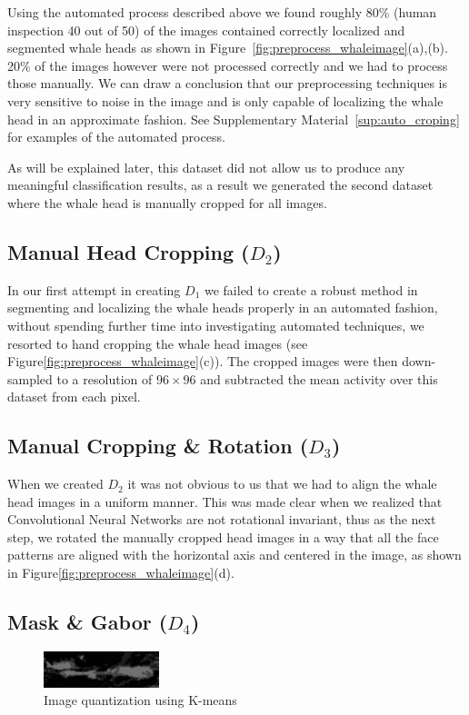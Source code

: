 Using the automated process described above we found roughly 80\% (human inspection 40 out of 50) of the images contained correctly localized and segmented whale heads as shown in Figure~\ref{fig:preprocess_whaleimage}(a),(b). 20\% of the images however were not processed correctly and we had to process those manually. We can draw a conclusion that our preprocessing techniques is very sensitive to noise in the image and is only capable of localizing the whale head in an approximate fashion. See Supplementary Material~\ref{sup:auto_croping} for examples of the automated process.

As will be explained later, this dataset did not allow us to produce any meaningful classification results, as a result we generated the second dataset where the whale head is manually cropped for all images.

\subsection{Manual Head Cropping ($D_{2}$)}
\label{subsec:manual_head_cropping}
In our first attempt in creating $D_{1}$ we failed to create a robust method in segmenting and localizing the whale heads properly in an automated fashion, without spending further time into investigating automated techniques, we resorted to hand cropping the whale head images (see Figure\ref{fig:preprocess_whaleimage}(c)). The cropped images were then down-sampled to a resolution of $96 \times 96$ and subtracted the mean activity over this dataset from each pixel.


\subsection{Manual Cropping \& Rotation ($D_{3}$)}
\label{subsec:manual_cropping_and_rotation}
When we created $D_{2}$ it was not obvious to us that we had to align the whale head images in a uniform manner. This was made clear when we realized that Convolutional Neural Networks are not rotational invariant, thus as the next step, we rotated the manually cropped head images in a way that all the face patterns are aligned with the horizontal axis and centered in the image, as shown in Figure\ref{fig:preprocess_whaleimage}(d).


\newpage
\subsection{Mask \& Gabor ($D_{4}$)}
\begin{figure}
	\centering
	\includegraphics[width=0.3\textwidth]{sections/imgs/preprocessing/kmeans.jpg}
	\caption{Image quantization using K-means}
	\label{fig:kmeans}
\end{figure}
\label{subsec:mask_and_gabor}

